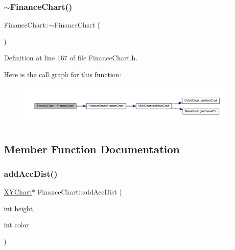 \subsubsection{\texorpdfstring{$\sim$\+Finance\+Chart()}{~FinanceChart()}}
{\footnotesize\ttfamily Finance\+Chart\+::$\sim$\+Finance\+Chart (\begin{DoxyParamCaption}{ }\end{DoxyParamCaption})\hspace{0.3cm}{\ttfamily [inline]}}



Definition at line 167 of file Finance\+Chart.\+h.

Here is the call graph for this function\+:
\nopagebreak
\begin{figure}[H]
\begin{center}
\leavevmode
\includegraphics[width=350pt]{class_finance_chart_a1e7439001aaf137a55e33a1add07f1eb_cgraph}
\end{center}
\end{figure}


\subsection{Member Function Documentation}
\mbox{\label{class_finance_chart_ae5545f015ca900f2b1300c675f249186}} 
\subsubsection{\texorpdfstring{add\+Acc\+Dist()}{addAccDist()}}
{\footnotesize\ttfamily \hyperlink{class_x_y_chart}{X\+Y\+Chart}$\ast$ Finance\+Chart\+::add\+Acc\+Dist (\begin{DoxyParamCaption}\item[{int}]{height,  }\item[{int}]{color }\end{DoxyParamCaption})\hspace{0.3cm}{\ttfamily [inline]}}



